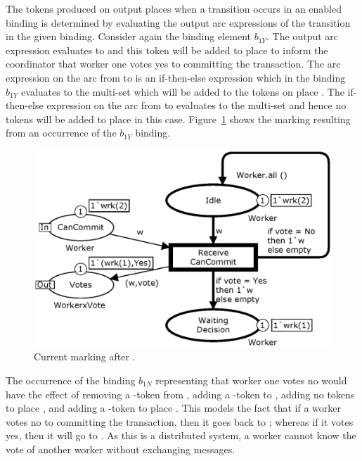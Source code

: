 
The tokens produced on output places when a transition occurs in an
enabled binding is determined by evaluating the output arc expressions
of the transition in the given binding. Consider again the binding
element $b_{1Y}$. The output arc expression 
evaluates to  and this token will be added to
place  to inform the coordinator that worker one votes
yes to committing the transaction. The arc expression on the arc from
 to  is an
if-then-else expression which in the binding $b_{1Y}$ evaluates to the
multi-set  which will be added to the tokens on
place . The if-then-else expression on the
arc from  to  evaluates to the
 multi-set and hence no tokens will be added to place
 in this case. Figure~\ref{fig:receivecancommit} shows
the marking resulting from an occurrence of the $b_{1Y}$ binding.

\begin{figure}[b]
\centering
\includegraphics[scale=.45]{figures/ReceiveCanCommit.eps}
\caption{Current marking after .}
\label{fig:receivecancommit}
\end{figure}

The occurrence of the binding $b_{1N}$ representing that worker one
votes no would have the effect of removing a -token
from , adding a -token to
, adding no tokens to place ,
and adding a -token to place . This
models the fact that if a worker votes no to committing the
transaction, then it goes back to ; whereas if it votes
yes, then it will go to .  As this is a
distributed system, a worker cannot know the vote of another worker
without exchanging messages.

